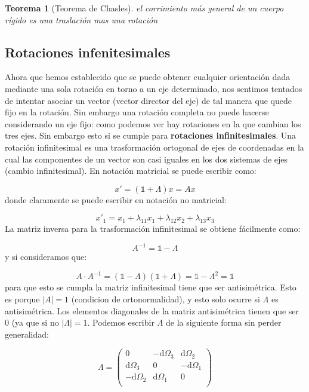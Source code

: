 \documentclass[12pt,a4paper]{book}
\newcommand{\D}{\mathrm{d}}
\newtheorem{theorem}{Teorema}[section]
\begin{document}
\begin{theorem}[Teorema de Chasles]
el corrimiento más general de un cuerpo rígido es una traslación mas una rotación
\end{theorem}


\subsection{Rotaciones infenitesimales}

Ahora que hemos establecido que se puede obtener cualquier orientación dada mediante una sola rotación en torno a un eje determinado, nos sentimos tentados de intentar asociar un vector (vector director del eje) de tal manera que quede fijo en la rotación. Sin embargo una rotación completa no puede hacerse considerando un eje fijo: como podemos ver hay rotaciones en la que cambian los tres ejes. Sin embargo esto si se cumple para \textbf{rotaciones infinitesimales}. Una rotación infinitesimal es una trasformación ortogonal de ejes de coordenadas en la cual las componentes de un vector son casi iguales en los dos sistemas de ejes (cambio infinitesimal). En notación matricial se puede escribir como:

$$ x' = (\mathds{1} + \Lambda ) x = A x $$
donde claramente se puede escribir en notación no matricial:

$$ x'_1 = x_1 + \lambda_{11} x_1 + \lambda_{12} x_2 + \lambda_{13} x_3 $$ 
La matriz inversa para la trasformación infinitesimal se obtiene fácilmente como:

$$A^{-1} = \mathds{1} - \Lambda$$
y si consideramos que:

$$ A \cdot A^{-1} = (\mathds{1} - \Lambda)(\mathds{1} + \Lambda)=\mathds{1} - \Lambda^2 = \mathds{1}  $$
para que esto se cumpla la matriz infinitesimal tiene que ser antisimétrica. Esto es porque $|A|=1$ (condicion de ortonormalidad), y esto solo ocurre si $\Lambda$ es antisimétrica. Los elementos diagonales de la matriz antisimétrica tienen que ser 0 (ya que si no $| \Lambda | = 1$. Podemos escribir $\Lambda$ de la siguiente forma sin perder generalidad:

\begin{equation}
\Lambda = \begin{pmatrix}
0 &
-\D \Omega_3 &
\D \Omega_2 \\ 
\D \Omega_3 &
0 &
-\D \Omega_1 \\ 
-\D \Omega_2 &
\D \Omega_1 &
0 \\ 
\end{pmatrix}
\end{equation}
\end{document}

